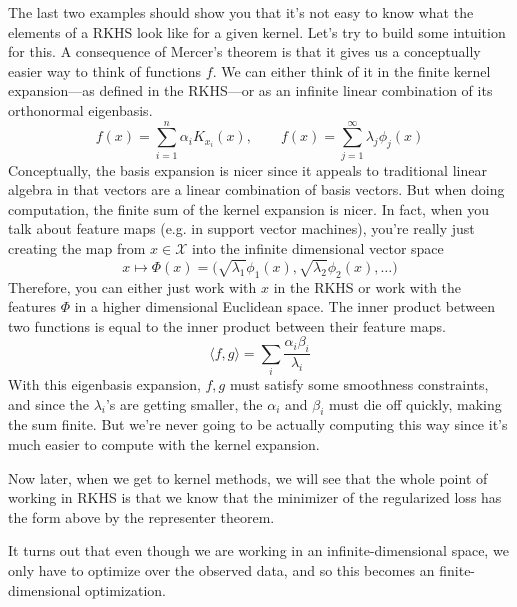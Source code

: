   The last two examples should show you that it's not easy to know what the elements of a RKHS look like for a given kernel. Let's try to build some intuition for this. A consequence of Mercer's theorem is that it gives us a conceptually easier way to think of functions $f$. We can either think of it in the finite kernel expansion---as defined in the RKHS---or as an infinite linear combination of its orthonormal eigenbasis. 
  \begin{equation}
    f(x) = \sum_{i=1}^n \alpha_i K_{x_i} (x), \qquad f(x) = \sum_{j=1}^\infty \lambda_j \phi_j(x)
  \end{equation}
  Conceptually, the basis expansion is nicer since it appeals to traditional linear algebra in that vectors are a linear combination of basis vectors. But when doing computation, the finite sum of the kernel expansion is nicer. In fact, when you talk about feature maps (e.g. in support vector machines), you're really just creating the map from $x \in \mathcal{X}$ into the infinite dimensional vector space 
  \begin{equation}
    x \mapsto \Phi(x) = \big( \sqrt{\lambda_1} \phi_1(x), \sqrt{\lambda_2} \phi_2(x), \ldots \big)
  \end{equation}
  Therefore, you can either just work with $x$ in the RKHS or work with the features $\Phi$ in a higher dimensional Euclidean space. The inner product between two functions is equal to the inner product between their feature maps. 
  \begin{equation}
    \langle f, g \rangle = \sum_i \frac{\alpha_i \beta_i}{\lambda_i} 
  \end{equation}
  With this eigenbasis expansion, $f, g$ must satisfy some smoothness constraints, and since the $\lambda_i$'s are getting smaller, the $\alpha_i$ and $\beta_i$ must die off quickly, making the sum finite. But we're never going to be actually computing this way since it's much easier to compute with the kernel expansion. 

  \begin{theorem}
    
  \end{theorem}

  Now later, when we get to kernel methods, we will see that the whole point of working in RKHS is that we know that the minimizer of the regularized loss has the form above by the representer theorem. 

  It turns out that even though we are working in an infinite-dimensional space, we only have to optimize over the observed data, and so this becomes an finite-dimensional optimization. 

